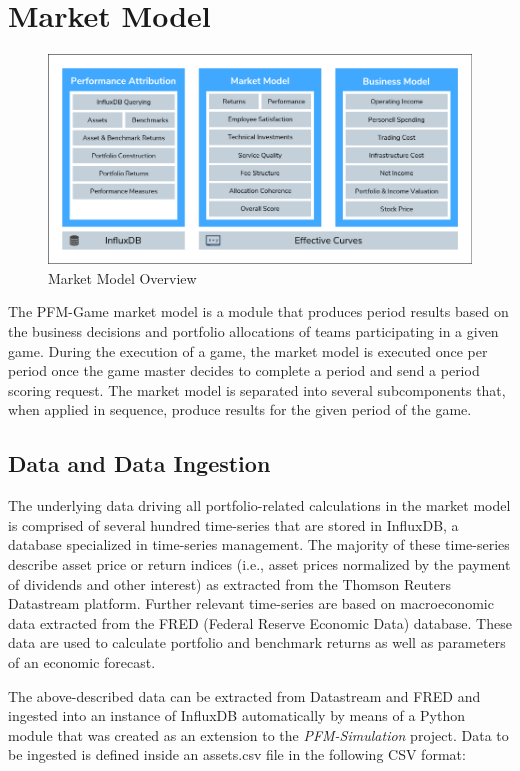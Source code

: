 \section{Market Model}
\label{sec:market_model}

\begin{figure}[h!]
    \includegraphics[width=\textwidth]{img/market_model.png}
    \caption{Market Model Overview}
    \centering
    \label{fig:market_model_overview}
\end{figure}

The PFM-Game market model is a module that produces period results based on the business decisions and portfolio allocations of teams participating in a given game. During the execution of a game, the market model is executed once per period once the game master decides to complete a period and send a period scoring request. The market model is separated into several subcomponents that, when applied in sequence, produce results for the given period of the game.

\subsection{Data and Data Ingestion}
The underlying data driving all portfolio-related calculations in the market model is comprised of several hundred time-series that are stored in InfluxDB, a database specialized in time-series management. The majority of these time-series describe asset price or return indices (i.e., asset prices normalized by the payment of dividends and other interest) as extracted from the Thomson Reuters Datastream platform. Further relevant time-series are based on macroeconomic data extracted from the FRED (Federal Reserve Economic Data) database. These data are used to calculate portfolio and benchmark returns as well as parameters of an economic forecast.

The above-described data can be extracted from Datastream and FRED and ingested into an instance of InfluxDB automatically by means of a Python module that was created as an extension to the \textit{PFM-Simulation} project. Data to be ingested is defined inside an assets.csv file in the following CSV format:

